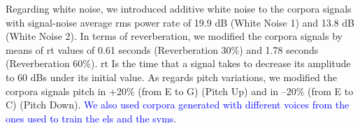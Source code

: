 \documentclass[10pt,letterpaper]{article}
\begin{document}



Regarding white noise, we introduced additive white noise to the corpora signals with signal-noise average \gls{rms} power rate of 19.9 dB (White Noise 1) and 13.8 dB (White Noise 2). In terms of reverberation, we modified the corpora signals by means of \gls{rt} values of 0.61 seconds (Reverberation 30\%) and 1.78 seconds (Reverberation 60\%). \gls{rt} Is the time that a signal takes to decrease its amplitude to 60 dBs under its initial value. As regards pitch variations, we modified the corpora signals pitch in +20\% (from E to G) (Pitch Up) and in --20\% (from E to C) (Pitch Down). \textcolor{blue}{We also used corpora generated with different voices from the ones used to train the \glspl{el} and the \glspl{svm}}.
\end{document}
